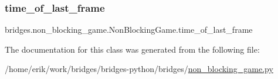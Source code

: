\subsubsection{\texorpdfstring{time\+\_\+of\+\_\+last\+\_\+frame}{time\_of\_last\_frame}}
{\footnotesize\ttfamily bridges.\+non\+\_\+blocking\+\_\+game.\+Non\+Blocking\+Game.\+time\+\_\+of\+\_\+last\+\_\+frame}



The documentation for this class was generated from the following file\+:\begin{DoxyCompactItemize}
\item 
/home/erik/work/bridges/bridges-\/python/bridges/\hyperlink{non__blocking__game_8py}{non\+\_\+blocking\+\_\+game.\+py}\end{DoxyCompactItemize}
